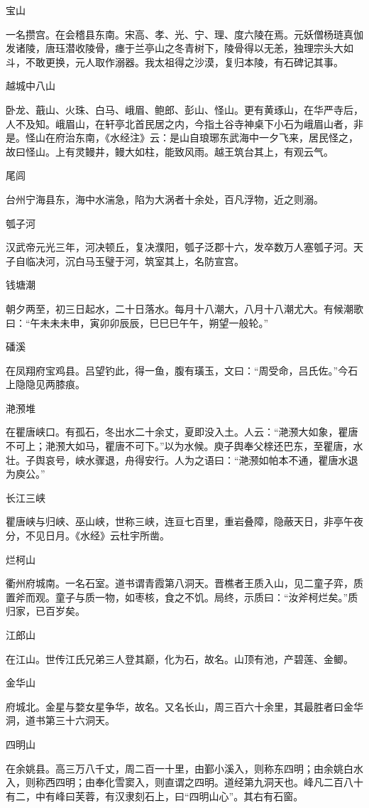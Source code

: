 \documentclass[a4paper,12pt,UTF8,twoside]{ctexbook}
\begin{document}
宝山

一名攒宫。在会稽县东南。宋高、孝、光、宁、理、度六陵在焉。元妖僧杨琏真伽发诸陵，唐珏潜收陵骨，瘗于兰亭山之冬青树下，陵骨得以无恙，独理宗头大如斗，不敢更换，元人取作溺器。我太祖得之沙漠，复归本陵，有石碑记其事。

越城中八山

卧龙、蕺山、火珠、白马、峨眉、鲍郎、彭山、怪山。更有黄琢山，在华严寺后，人不及知。峨眉山，在轩亭北首民居之内，今指土谷寺神桌下小石为峨眉山者，非是。怪山在府治东南，《水经注》云：是山自琅琊东武海中一夕飞来，居民怪之，故曰怪山。上有灵鳗井，鳗大如柱，能致风雨。越王筑台其上，有观云气。

尾闾

台州宁海县东，海中水湍急，陷为大涡者十余处，百凡浮物，近之则溺。

瓠子河

汉武帝元光三年，河决顿丘，复决濮阳，瓠子泛郡十六，发卒数万人塞瓠子河。天子自临决河，沉白马玉璧于河，筑室其上，名防宣宫。

钱塘潮

朝夕两至，初三日起水，二十日落水。每月十八潮大，八月十八潮尤大。有候潮歌曰：“午未未未申，寅卯卯辰辰，巳巳巳午午，朔望一般轮。”

磻溪

在凤翔府宝鸡县。吕望钓此，得一鱼，腹有璜玉，文曰：“周受命，吕氏佐。”今石上隐隐见两膝痕。

滟滪堆

在瞿唐峡口。有孤石，冬出水二十余丈，夏即没入土。人云：“滟滪大如象，瞿唐不可上；滟滪大如马，瞿唐不可下。”以为水候。庾子舆奉父榇还巴东，至瞿唐，水壮。子舆哀号，峡水骤退，舟得安行。人为之语曰：“滟滪如帕本不通，瞿唐水退为庾公。”

长江三峡

瞿唐峡与归峡、巫山峡，世称三峡，连亘七百里，重岩叠障，隐蔽天日，非亭午夜分，不见日月。《水经》云杜宇所凿。

烂柯山

衢州府城南。一名石室。道书谓青霞第八洞天。晋樵者王质入山，见二童子弈，质置斧而观。童子与质一物，如枣核，食之不饥。局终，示质曰：“汝斧柯烂矣。”质归家，已百岁矣。

江郎山

在江山。世传江氏兄弟三人登其巅，化为石，故名。山顶有池，产碧莲、金鲫。

金华山

府城北。金星与婺女星争华，故名。又名长山，周三百六十余里，其最胜者曰金华洞，道书第三十六洞天。

四明山

在余姚县。高三万八千丈，周二百一十里，由鄞小溪入，则称东四明；由余姚白水入，则称西四明；由奉化雪窦入，则直谓之四明。道经第九洞天也。峰凡二百八十有二，中有峰曰芙蓉，有汉隶刻石上，曰“四明山心”。其右有石窗。
\end{document}
